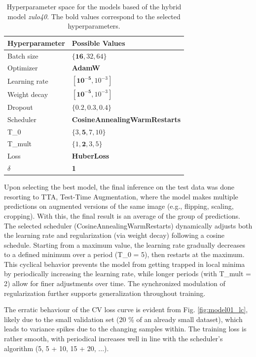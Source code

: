 \documentclass[conference]{IEEEtran}
\begin{document}
\begin{table}[b]
\centering
\caption{Hyperparameter space for the models based of the hybrid model \textit{zulo40}. The bold values correspond to the selected hyperparameters.}
\label{parametroszulp}
\begin{tabular}{ll}
\toprule
\textbf{Hyperparameter} & \textbf{Possible Values} \\
\midrule
Batch size & $\{\mathbf{16}, 32, 64\}$ \\
Optimizer & \textbf{AdamW} \\
Learning rate & $[\mathbf{10^{-5}}, 10^{-3}]$ \\
Weight decay & $[\mathbf{10^{-5}}, 10^{-3}]$ \\
Dropout & $\{0.2, 0.3, \mathbf{0.4}\}$ \\
Scheduler & \textbf{CosineAnnealingWarmRestarts} \\
T\_0 & $\{3, \mathbf{5}, 7, 10\}$ \\
T\_mult & $\{1, \mathbf{2}, 3, 5\}$ \\
Loss & \textbf{HuberLoss} \\
$\delta$ & \textbf{1} \\
\bottomrule
\end{tabular}
\end{table}
\newpage

Upon selecting the best model, the final inference on the test data was done resorting to TTA, Test-Time Augmentation, where the model makes multiple predictions on augmented versions of the same image (e.g., flipping, scaling, cropping). With this, the final result is an average of the group of predictions. The selected scheduler (CosineAnnealingWarmRestarts) dynamically adjusts both the learning rate and regularization (via weight decay) following a cosine schedule. Starting from a maximum value, the learning rate gradually decreases to a defined minimum over a period (T\_0 = 5), then restarts at the maximum. This cyclical behavior prevents the model from getting trapped in local minima by periodically increasing the learning rate, while longer periods (with T\_mult = 2) allow for finer adjustments over time. The synchronized modulation of regularization further supports generalization throughout training.

The erratic behaviour of the CV loss curve is evident from Fig. \ref{fig:model01_lc}, likely due to the small validation set (20 \% of an already small dataset), which leads to variance spikes due to the changing samples within. The training loss is rather smooth, with periodical increases well in line with the scheduler's algorithm (5, 5 + 10, 15 + 20, ...).
\end{document}
